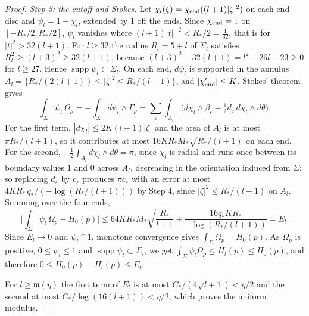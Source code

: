 \begin{proof}
\emph{Step 5: the cutoff and Stokes.} Let $\chi_l(\zeta)=\chi_{\rm end}((l+1)|\zeta|^2)$ on each end disc and
$\psi_l=1-\chi_l$, extended by $1$ off the ends. Since $\chi_{\rm end}=1$ on $[-R_*/2,R_*/2]$, $\psi_l$
vanishes where $(l+1)|t|^{-2}<R_*/2=\frac1{32}$, that is for $|t|^2>32(l+1)$. For $l\ge32$ the radius
$R_l=5+l$ of $\Sigma_l$ satisfies $R_l^2\ge(l+3)^2\ge32(l+1)$, because $(l+3)^2-32(l+1)=l^2-26l-23\ge0$ for
$l\ge27$. Hence $\operatorname{supp}\psi_l\subset\Sigma_l$. On each end, $d\psi_l$ is supported in the annulus
$A_l=\{R_*/(2(l+1))\le|\zeta|^2\le R_*/(l+1)\}$, and $|\chi_{\rm end}'|\le K$. Stokes' theorem gives
\[
 \int_\Sigma\psi_l\,\Omega_p=-\int_\Sigma d\psi_l\wedge\Gamma_p
 =\sum_\varepsilon\int_{A_l}\Big(d\chi_l\wedge\beta_\varepsilon-\tfrac12d_\varepsilon\,d\chi_l\wedge d\theta\Big).
\]
For the first term, $|d\chi_l|\le2K(l+1)|\zeta|$ and the area of $A_l$ is at most $\pi R_*/(l+1)$, so it contributes at
most $16KR_*M_*\sqrt{R_*/(l+1)}$ on each end. For the second, $-\frac12\int_{A_l}d\chi_l\wedge d\theta=\pi$, since $\chi_l$ is radial and runs once between its boundary values
$1$ and $0$ across $A_l$, decreasing in the orientation induced from $\Sigma$; so replacing $d_\varepsilon$ by
$c_\varepsilon$ produces $\pi c_\varepsilon$ with an error at most $4KR_*\,q_*/(-\log(R_*/(l+1)))$ by Step 4, since $|\zeta|^2\le R_*/(l+1)$ on $A_l$. Summing over the four ends,
\[
 \Big|\int_\Sigma\psi_l\,\Omega_p-H_0(p)\Big|\le
 64KR_*M_*\sqrt{\frac{R_*}{l+1}}+\frac{16q_*KR_*}{-\log(R_*/(l+1))}=E_l .
\]
Since $E_l\to0$ and $\psi_l\uparrow1$, monotone convergence gives $\int_\Sigma\Omega_p=H_0(p)$. As $\Omega_p$ is positive,
$0\le\psi_l\le1$ and $\operatorname{supp}\psi_l\subset\Sigma_l$, we get $\int_\Sigma\psi_l\Omega_p\le H_l(p)\le H_0(p)$, and therefore
$0\le H_0(p)-H_l(p)\le E_l$.

For $l\ge\mathfrak m(\eta)$ the first term of $E_l$ is at most $C_*/(4\sqrt{l+1})<\eta/2$ and the second at most
$C_*/\log(16(l+1))<\eta/2$, which proves the uniform modulus.
\end{proof}
